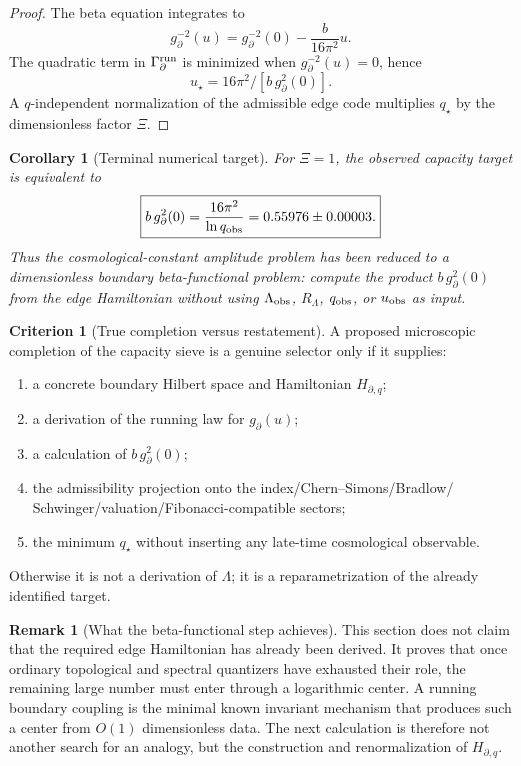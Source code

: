 \documentclass[aps,prd,reprint,nofootinbib,superscriptaddress,floatfix]{revtex4-2}
\numberwithin{equation}{section}
\theoremstyle{definition}
\newtheorem{criterion}{Criterion}[section]
\newtheorem{remark}{Remark}[section]
\theoremstyle{plain}
\newtheorem{corollary}{Corollary}[section]
\begin{document}
\begin{proof}
The beta equation integrates to
\begin{equation}
g_\partial^{-2}(u)
=
g_\partial^{-2}(0)-\frac{b}{16\pi^2}u .
\end{equation}
The quadratic term in \(\Gamma_{\partial}^{\rm run}\) is minimized when
\(g_\partial^{-2}(u)=0\), hence
\[
u_\star=16\pi^2/[b\,g_\partial^2(0)] .
\]
A \(q\)-independent normalization of the admissible edge code multiplies
\(q_\star\) by the dimensionless factor \(\Xi\).
\end{proof}

\begin{corollary}[Terminal numerical target]
For \(\Xi=1\), the observed capacity target is equivalent to
\begin{equation}
\boxed{
b\,g_\partial^2(0)
=
\frac{16\pi^2}{\ln q_{\rm obs}}
=
0.55976\pm0.00003 .
}
\end{equation}
Thus the cosmological-constant amplitude problem has been reduced to a
dimensionless boundary beta-functional problem: compute the product
\(b\,g_\partial^2(0)\) from the edge Hamiltonian without using
\(\Lambda_{\rm obs}\), \(R_\Lambda\), \(q_{\rm obs}\), or \(u_{\rm obs}\) as input.
\end{corollary}

\begin{criterion}[True completion versus restatement]
A proposed microscopic completion of the capacity sieve is a genuine
selector only if it supplies:
\begin{enumerate}
\item a concrete boundary Hilbert space and Hamiltonian \(H_{\partial,q}\);
\item a derivation of the running law for \(g_\partial(u)\);
\item a calculation of \(b\,g_\partial^2(0)\);
\item the admissibility projection onto the index/Chern--Simons/Bradlow/
Schwinger/valuation/Fibonacci-compatible sectors;
\item the minimum \(q_\star\) without inserting any late-time cosmological
observable.
\end{enumerate}
Otherwise it is not a derivation of \(\Lambda\); it is a reparametrization of
the already identified target.
\end{criterion}

\begin{remark}[What the beta-functional step achieves]
This section does not claim that the required edge Hamiltonian has already
been derived.  It proves that once ordinary topological and spectral
quantizers have exhausted their role, the remaining large number must enter
through a logarithmic center.  A running boundary coupling is the minimal
known invariant mechanism that produces such a center from \(O(1)\)
dimensionless data.  The next calculation is therefore not another search
for an analogy, but the construction and renormalization of
\(H_{\partial,q}\).
\end{remark}
\end{document}
